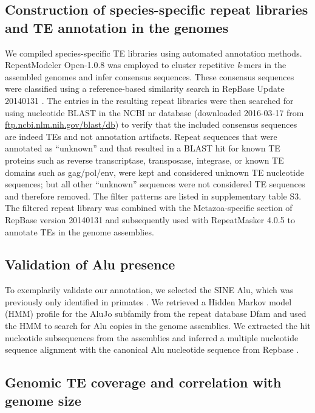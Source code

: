 \subsection{Construction of species-specific repeat libraries and TE
annotation in the
genomes}\label{construction-of-species-specific-repeat-libraries-and-te-annotation-in-the-genomes}

We compiled species-specific TE libraries using automated annotation
methods. RepeatModeler Open-1.0.8 \citep{Smit2015} was employed to
cluster repetitive \emph{k}-mers in the assembled genomes and infer
consensus sequences. These consensus sequences were classified using a
reference-based similarity search in RepBase Update 20140131
\citep{Jurka2005}. The entries in the resulting repeat libraries were
then searched for using nucleotide BLAST in the NCBI nr database
(downloaded 2016-03-17 from
\href{ftp://ftp.ncbi.nlm.nih.gov/blast/db}{ftp.ncbi.nlm.nih.gov/blast/db})
to verify that the included consensus sequences are indeed TEs and not
annotation artifacts. Repeat sequences that were annotated as
``unknown'' and that resulted in a BLAST hit for known TE proteins such
as reverse transcriptase, transposase, integrase, or known TE domains
such as gag/pol/env, were kept and considered unknown TE nucleotide
sequences; but all other ``unknown'' sequences were not considered TE
sequences and therefore removed. The filter patterns are listed in
supplementary table S3. The filtered repeat library was combined with
the Metazoa-specific section of RepBase version 20140131 and
subsequently used with RepeatMasker 4.0.5 \citep{Smit2015} to annotate
TEs in the genome assemblies.

\subsection{Validation of Alu
presence}\label{validation-of-alu-presence}

To exemplarily validate our annotation, we selected the SINE Alu, which
was previously only identified in primates \citep{Kriegs2007}. We
retrieved a Hidden Markov model (HMM) profile for the AluJo subfamily
from the repeat database Dfam \citep{Hubley2016} and used the HMM to
search for Alu copies in the genome assemblies. We extracted the hit
nucleotide subsequences from the assemblies and inferred a multiple
nucleotide sequence alignment with the canonical Alu nucleotide sequence
from Repbase \citep{Jurka2005}.

\subsection{Genomic TE coverage and correlation with genome
size}\label{genomic-te-coverage-and-correlation-with-genome-size}

